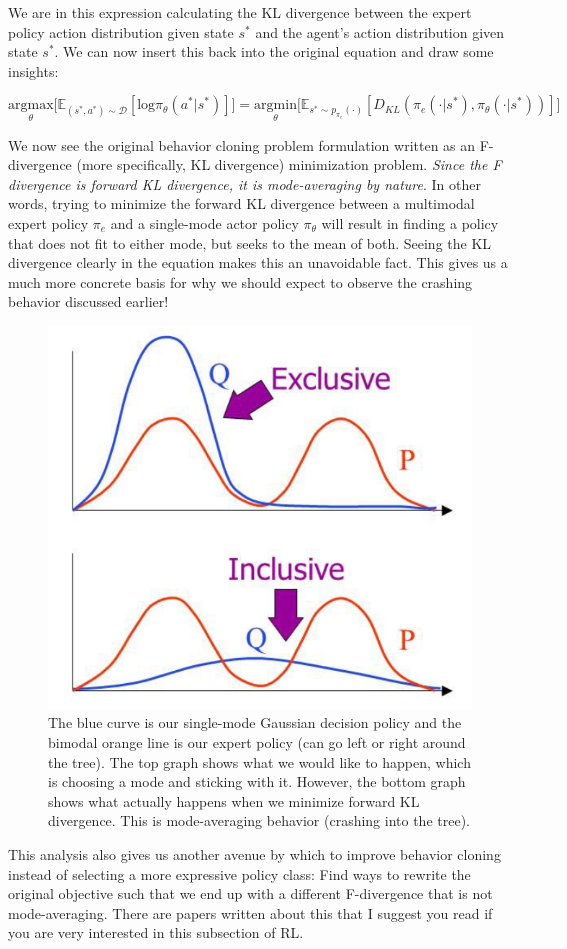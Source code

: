 \begin{flushleft}
    We are in this expression calculating the KL divergence between the expert policy action distribution given state $s^\ast$ and the agent's action distribution given state $s^\ast$. We can now insert this back into the original equation and draw some insights:

    $$\underset{\theta}{\textrm{argmax}}\biggl[\mathbb{E}_{(s^\ast,a^\ast) \sim \mathcal{D}}[\mathrm{log}\pi_\theta(a^\ast|s^\ast)]\biggr] = \underset{\theta}{\textrm{argmin}}\biggl[\mathbb{E}_{s^\ast \sim p_{\pi_e}(\cdot)}[D_{KL}(\pi_e(\cdot|s^\ast),\pi_\theta(\cdot|s^\ast))]\biggr]$$

    We now see the original behavior cloning problem formulation written as an F-divergence (more specifically, KL divergence) minimization problem. \textit{Since the F divergence is forward KL divergence, it is mode-averaging by nature}. In other words, trying to minimize the forward KL divergence between a multimodal expert policy $\pi_e$ and a single-mode actor policy $\pi_\theta$ will result in finding a policy that does not fit to either mode, but seeks to the mean of both. Seeing the KL divergence clearly in the equation makes this an unavoidable fact. This gives us a much more concrete basis for why we should expect to observe the crashing behavior discussed earlier!

    \begin{figure}[H]
        \centering
        \includegraphics[width=0.7\linewidth]{rl/diffkl.png}
        \caption{The blue curve is our single-mode Gaussian decision policy and the bimodal orange line is our expert policy (can go left or right around the tree). The top graph shows what we would like to happen, which is choosing a mode and sticking with it. However, the bottom graph shows what actually happens when we minimize forward KL divergence. This is mode-averaging behavior (crashing into the tree).}
        \label{fig:diffkl}
    \end{figure}

    This analysis also gives us another avenue by which to improve behavior cloning instead of selecting a more expressive policy class: Find ways to rewrite the original objective such that we end up with a different F-divergence that is not mode-averaging. There are papers written about this that I suggest you read if you are very interested in this subsection of RL.
\end{flushleft}

